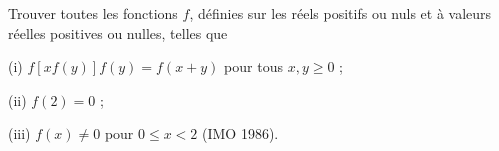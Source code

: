 Trouver toutes les fonctions $f$, définies sur les réels positifs ou nuls et à valeurs réelles positives ou nulles, telles que

(i) $f[xf(y)]f(y) = f(x + y)$ pour tous $x, y \geq 0$ ;

(ii) $f(2) = 0$ ;

(iii) $f(x) \neq 0$ pour $0 \leq x < 2$ (IMO 1986).
